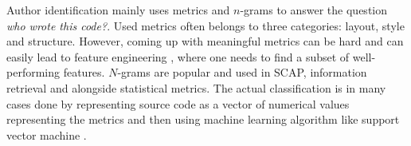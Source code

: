 Author identification mainly uses metrics and $n$-grams to answer the question \emph{who wrote this code?}. Used metrics often belongs to three categories: layout, style and structure. However, coming up with meaningful metrics can be hard and can easily lead to feature engineering \cite{EJPFSAI2004}, where one needs to find a subset of well-performing features. $N$-grams are popular and used in SCAP, information retrieval and alongside statistical metrics. The actual classification is in many cases done by representing source code as a vector of numerical values representing the metrics and then using machine learning algorithm like support vector machine \cite{SDNAIJSP2015}. 



